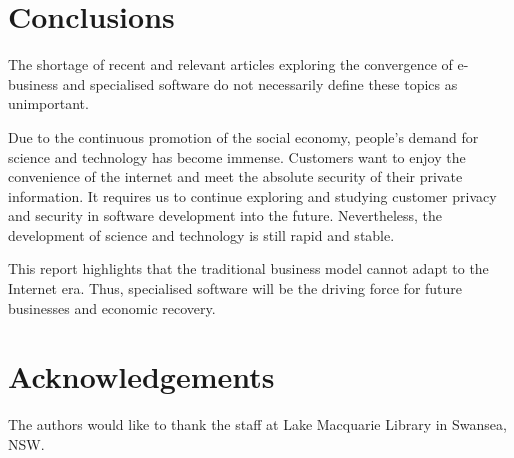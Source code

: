 \documentclass[a0,portrait]{a0poster}
\begin{document}
\begin{multicols}{2}
\color{Teal}

\section*{Conclusions}
The shortage of recent and relevant articles exploring the convergence of e-business and specialised software do not necessarily define these topics as unimportant. \par 
Due to the continuous promotion of the social economy, people’s demand for science and technology has become immense. Customers want to enjoy the convenience of the internet and meet the absolute security of their private information. It requires us to continue exploring and studying customer privacy and security in software development into the future. Nevertheless, the development of science and technology is still rapid and stable. \par 
This report highlights that the traditional business model cannot adapt to the Internet era. Thus, specialised software will be the driving force for future businesses and economic recovery. \par

\color{DarkSlateGray}


\section*{Acknowledgements}
The authors would like to thank the staff at Lake Macquarie Library in Swansea, NSW.

\end{multicols}
\end{document}

